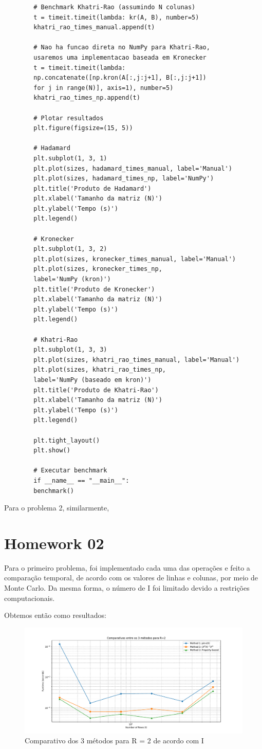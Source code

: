 \documentclass[a4paper, 12pt]{article}
\let\oldsection\section
\renewcommand{\section}[1]{{\vspace{20pt}\oldsection*{#1}\vspace{-10pt}}}
\begin{document}
\begin{lstlisting}
		# Benchmark Khatri-Rao (assumindo N colunas)
		t = timeit.timeit(lambda: kr(A, B), number=5)
		khatri_rao_times_manual.append(t)
		
		# Nao ha funcao direta no NumPy para Khatri-Rao,
		usaremos uma implementacao baseada em Kronecker
		t = timeit.timeit(lambda: 
		np.concatenate([np.kron(A[:,j:j+1], B[:,j:j+1])
		for j in range(N)], axis=1), number=5)
		khatri_rao_times_np.append(t)
		
		# Plotar resultados
		plt.figure(figsize=(15, 5))
		
		# Hadamard
		plt.subplot(1, 3, 1)
		plt.plot(sizes, hadamard_times_manual, label='Manual')
		plt.plot(sizes, hadamard_times_np, label='NumPy')
		plt.title('Produto de Hadamard')
		plt.xlabel('Tamanho da matriz (N)')
		plt.ylabel('Tempo (s)')
		plt.legend()
		
		# Kronecker
		plt.subplot(1, 3, 2)
		plt.plot(sizes, kronecker_times_manual, label='Manual')
		plt.plot(sizes, kronecker_times_np, 
		label='NumPy (kron)')
		plt.title('Produto de Kronecker')
		plt.xlabel('Tamanho da matriz (N)')
		plt.ylabel('Tempo (s)')
		plt.legend()
		
		# Khatri-Rao
		plt.subplot(1, 3, 3)
		plt.plot(sizes, khatri_rao_times_manual, label='Manual')
		plt.plot(sizes, khatri_rao_times_np, 
		label='NumPy (baseado em kron)')
		plt.title('Produto de Khatri-Rao')
		plt.xlabel('Tamanho da matriz (N)')
		plt.ylabel('Tempo (s)')
		plt.legend()
		
		plt.tight_layout()
		plt.show()
		
		# Executar benchmark
		if __name__ == "__main__":
		benchmark()
	\end{lstlisting}
	
	Para o problema 2, similarmente, 
	
	\section{Homework 02}
	
	Para o primeiro problema, foi implementado cada uma das operações e feito a comparação temporal, de acordo com os valores de linhas e colunas, por meio de Monte Carlo. Da mesma forma, o número de I foi limitado devido a restrições computacionais. 
	
	Obtemos então como resultados:
	
	\begin{figure}[!h]
		\centering
		\includegraphics[width=\linewidth]{images/3met_r2.pdf}
		\caption{Comparativo dos 3 métodos para R = 2 de acordo com I}
		\label{fig:3metr2}
	\end{figure}
	
\end{document}
